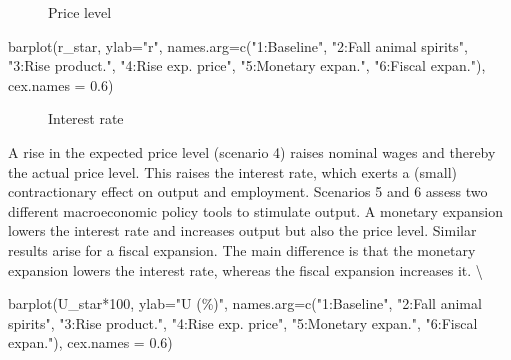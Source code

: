\documentclass[
  letterpaper,
  DIV=11,
  numbers=noendperiod]{scrreprt}
\newenvironment{Shaded}{\begin{snugshade}}{\end{snugshade}}
\newcommand{\AttributeTok}[1]{\textcolor[rgb]{0.40,0.45,0.13}{#1}}
\newcommand{\DecValTok}[1]{\textcolor[rgb]{0.68,0.00,0.00}{#1}}
\newcommand{\FloatTok}[1]{\textcolor[rgb]{0.68,0.00,0.00}{#1}}
\newcommand{\FunctionTok}[1]{\textcolor[rgb]{0.28,0.35,0.67}{#1}}
\newcommand{\NormalTok}[1]{\textcolor[rgb]{0.00,0.23,0.31}{#1}}
\newcommand{\SpecialCharTok}[1]{\textcolor[rgb]{0.37,0.37,0.37}{#1}}
\newcommand{\StringTok}[1]{\textcolor[rgb]{0.13,0.47,0.30}{#1}}
\begin{document}
\begin{figure}[H]


\caption{\label{fig-price-level-neocl-macro}Price level}

\end{figure}%

\begin{Shaded}
\begin{Highlighting}[]
\FunctionTok{barplot}\NormalTok{(r\_star, }\AttributeTok{ylab=}\StringTok{"r"}\NormalTok{, }\AttributeTok{names.arg=}\FunctionTok{c}\NormalTok{(}\StringTok{"1:Baseline"}\NormalTok{, }\StringTok{"2:Fall animal spirits"}\NormalTok{, }\StringTok{"3:Rise product."}\NormalTok{,}
                                      \StringTok{"4:Rise exp. price"}\NormalTok{, }\StringTok{"5:Monetary expan."}\NormalTok{, }\StringTok{"6:Fiscal expan."}\NormalTok{), }\AttributeTok{cex.names =} \FloatTok{0.6}\NormalTok{)}
\end{Highlighting}
\end{Shaded}

\begin{figure}[H]


\caption{\label{fig-interest_rate-neocl-macro}Interest rate}

\end{figure}%

A rise in the expected price level (scenario 4) raises nominal wages and
thereby the actual price level. This raises the interest rate, which
exerts a (small) contractionary effect on output and employment.
Scenarios 5 and 6 assess two different macroeconomic policy tools to
stimulate output. A monetary expansion lowers the interest rate and
increases output but also the price level. Similar results arise for a
fiscal expansion. The main difference is that the monetary expansion
lowers the interest rate, whereas the fiscal expansion increases it.
\textbackslash{}

\begin{Shaded}
\begin{Highlighting}[]
\FunctionTok{barplot}\NormalTok{(U\_star}\SpecialCharTok{*}\DecValTok{100}\NormalTok{, }\AttributeTok{ylab=}\StringTok{"U (\%)"}\NormalTok{, }\AttributeTok{names.arg=}\FunctionTok{c}\NormalTok{(}\StringTok{"1:Baseline"}\NormalTok{, }\StringTok{"2:Fall animal spirits"}\NormalTok{, }\StringTok{"3:Rise product."}\NormalTok{,}
                                              \StringTok{"4:Rise exp. price"}\NormalTok{, }\StringTok{"5:Monetary expan."}\NormalTok{, }\StringTok{"6:Fiscal expan."}\NormalTok{), }\AttributeTok{cex.names =} \FloatTok{0.6}\NormalTok{)}
\end{Highlighting}
\end{Shaded}
\end{document}

